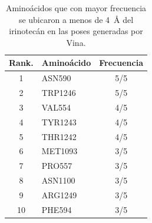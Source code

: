 \begin{table}[htbp]
\centering
\caption{Aminoácidos que con mayor frecuencia se ubicaron a menos de 4~Å del irinotecán en las poses generadas por Vina.}
\label{tab:frecuencia_residuos}
\begin{tabular}{clc}
\toprule
\textbf{Rank.} & \textbf{Aminoácido} & \textbf{Frecuencia} \\
\midrule
1  & ASN590  & 5/5 \\
2  & TRP1246 & 5/5 \\
3  & VAL554  & 4/5 \\
4  & TYR1243 & 4/5 \\
5  & THR1242 & 4/5 \\
6  & MET1093 & 3/5 \\
7  & PRO557  & 3/5 \\
8  & ASN1100 & 3/5 \\
9  & ARG1249 & 3/5 \\
10 & PHE594  & 3/5 \\
\bottomrule
\end{tabular}
\end{table}
